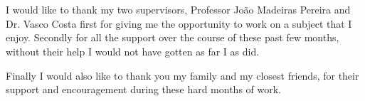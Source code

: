 
\section*{\acknowledgments}


I would like to thank my two supervisors, Professor João Madeiras Pereira and Dr. Vasco Costa first for giving me the opportunity to work on a subject that I enjoy. Secondly for all the support over the course of these past few months, without their help I would not have gotten as far I as did.

Finally I would also like to thank you my family and my closest friends, for their support and encouragement during these hard months of work.